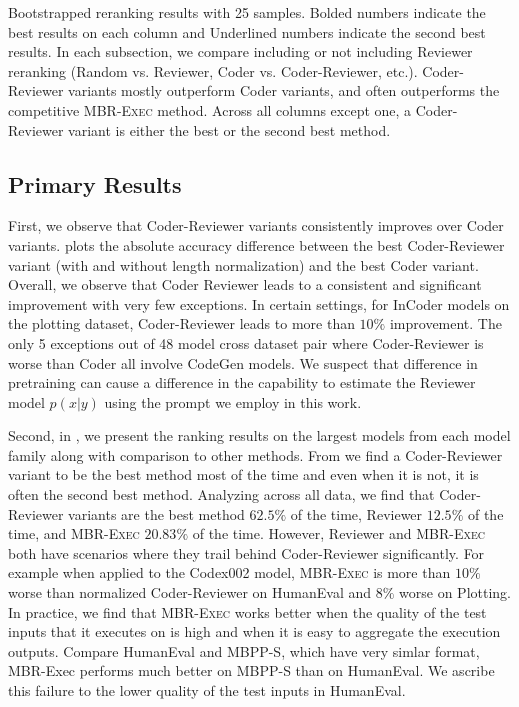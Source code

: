 \documentclass[nohyperref]{article}
\theoremstyle{plain}
\theoremstyle{definition}
\theoremstyle{remark}
\begin{document}
\begin{table*}[]
{ }
\vspace{-5pt}
\caption{Bootstrapped reranking results with 25 samples. 
Bolded numbers indicate the best results on each column and Underlined numbers indicate the second best results.
In each subsection, we compare including or not including Reviewer reranking (Random vs. Reviewer, Coder vs. Coder-Reviewer, etc.).
Coder-Reviewer variants mostly outperform Coder variants, and often outperforms the competitive MBR-\textsc{Exec} method.
Across all columns except one, a Coder-Reviewer variant is either the best or the second best method.
}

\label{tab:main_table}
\vspace{-10pt}
\end{table*}


\subsection{Primary Results}
\label{sec:main-results}


First, we observe that Coder-Reviewer variants consistently improves over Coder variants. 
 plots the absolute accuracy difference between the best Coder-Reviewer variant (with and without length normalization) and the best Coder variant.
Overall, we observe that Coder Reviewer leads to a consistent and significant improvement with very few exceptions.
In certain settings, \eg for InCoder models on the plotting dataset, Coder-Reviewer leads to more than $10\%$ improvement.
The only 5 exceptions out of 48 model cross dataset pair where Coder-Reviewer is worse than Coder all involve CodeGen models.
We suspect that difference in pretraining can cause a difference in the capability to estimate the Reviewer model $p(x|y)$ using the prompt we employ in this work.

Second, in , we present the ranking results on the largest models from each model family along with comparison to other methods.
From  we find a Coder-Reviewer variant to be the best method most of the time and even when it is not, it is often the second best method.
Analyzing across all data, we find that Coder-Reviewer variants are the best method $62.5\%$ of the time, Reviewer $12.5\%$ of the time, and MBR-\textsc{Exec} $20.83\%$ of the time.
However, Reviewer and MBR-\textsc{Exec} both have scenarios where they trail behind Coder-Reviewer significantly.
For example when applied to the Codex002 model, MBR-\textsc{Exec} is more than $10\%$ worse than normalized Coder-Reviewer on HumanEval and $8\%$ worse on Plotting.
In practice, we find that MBR-\textsc{Exec} works better when the quality of the test inputs that it executes on is high and when it is easy to aggregate the execution outputs.
Compare HumanEval and MBPP-S, which have very simlar format, MBR-Exec performs much better on MBPP-S than on HumanEval.
We ascribe this failure to the lower quality of the test inputs in HumanEval.
\end{document}
